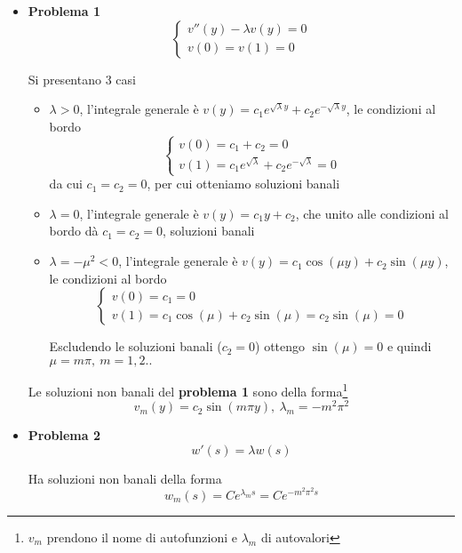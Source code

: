 \documentclass[10pt,a4paper,twoside,openright]{book}
\begin{document}
\begin{itemize}
\item \textbf{Problema 1}\begin{equation*}
\begin{cases}
v'' (y) -\lambda v(y) =0\\
v(0) =v(1) =0
\end{cases}
\end{equation*}

Si presentano 3 casi
\begin{itemize}
\item $\displaystyle \lambda  >0$, l'integrale generale è $\displaystyle v(y) =c_{1} e^{\sqrt{\lambda } y} +c_{2} e^{-\sqrt{\lambda } y}$, le condizioni al bordo\begin{equation*}
\begin{cases}
v(0) =c_{1} +c_{2} =0\\
v(1) =c_{1} e^{\sqrt{\lambda }} +c_{2} e^{-\sqrt{\lambda }} =0
\end{cases}
\end{equation*}da cui $\displaystyle c_{1} =c_{2} =0$, per cui otteniamo soluzioni banali
\item $\displaystyle \lambda =0$, l'integrale generale è $\displaystyle v(y) =c_{1} y+c_{2}$, che unito alle condizioni al bordo dà $\displaystyle c_{1} =c_{2} =0$, soluzioni banali
\item $\displaystyle \lambda =-\mu ^{2} < 0$, l'integrale generale è $\displaystyle v(y) =c_{1}\cos(\mu y) +c_{2}\sin(\mu y)$, le condizioni al bordo\begin{equation*}
\begin{cases}
v(0) =c_{1} =0\\
v(1) =c_{1}\cos(\mu) +c_{2}\sin(\mu) =c_{2}\sin(\mu) =0
\end{cases}
\end{equation*}

Escludendo le soluzioni banali ($\displaystyle c_{2} =0$) ottengo $\displaystyle \sin(\mu) =0$ e quindi $\displaystyle \mu =m\pi,\ m=1,2..$ 
\end{itemize}

Le soluzioni non banali del \textbf{problema 1} sono della forma\footnote{$\displaystyle v_{m}$ prendono il nome di autofunzioni e $\displaystyle \lambda _{m}$ di autovalori}\begin{equation*}
\boxed{v_{m}(y) =c_{2}\sin(m\pi y),\ \lambda _{m} =-m^{2} \pi ^{2}}
\end{equation*}


\item \textbf{Problema 2}\begin{equation*}
w'(s) =\lambda w(s)
\end{equation*}

Ha soluzioni non banali della forma\begin{equation*}
\boxed{w_{m}(s) =Ce^{\lambda _{m} s} =Ce^{-m^{2} \pi ^{2} s}}
\end{equation*}
\end{itemize}
\end{document}
